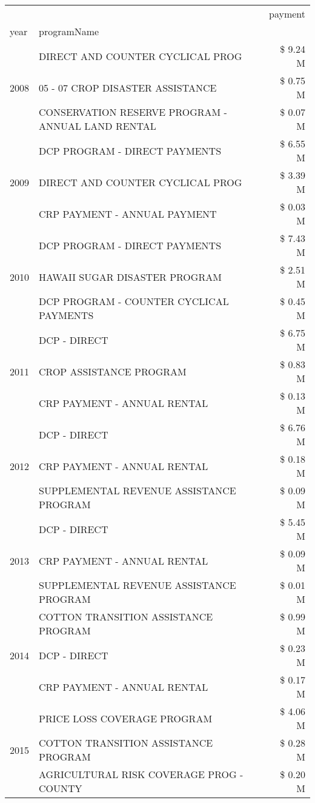 \begin{tabular}{llr}
\toprule
 &  & payment \\
year & programName &  \\
\midrule
\multirow[t]{3}{*}{2008} & DIRECT AND COUNTER CYCLICAL PROG & \$ 9.24 M \\
 & 05 - 07 CROP DISASTER ASSISTANCE & \$ 0.75 M \\
 & CONSERVATION RESERVE PROGRAM - ANNUAL LAND RENTAL & \$ 0.07 M \\
\cline{1-3}
\multirow[t]{3}{*}{2009} & DCP PROGRAM - DIRECT PAYMENTS & \$ 6.55 M \\
 & DIRECT AND COUNTER CYCLICAL PROG & \$ 3.39 M \\
 & CRP PAYMENT - ANNUAL PAYMENT & \$ 0.03 M \\
\cline{1-3}
\multirow[t]{3}{*}{2010} & DCP PROGRAM - DIRECT PAYMENTS & \$ 7.43 M \\
 & HAWAII SUGAR DISASTER PROGRAM & \$ 2.51 M \\
 & DCP PROGRAM - COUNTER CYCLICAL PAYMENTS & \$ 0.45 M \\
\cline{1-3}
\multirow[t]{3}{*}{2011} & DCP - DIRECT & \$ 6.75 M \\
 & CROP ASSISTANCE PROGRAM & \$ 0.83 M \\
 & CRP PAYMENT - ANNUAL RENTAL & \$ 0.13 M \\
\cline{1-3}
\multirow[t]{3}{*}{2012} & DCP - DIRECT & \$ 6.76 M \\
 & CRP PAYMENT - ANNUAL RENTAL & \$ 0.18 M \\
 & SUPPLEMENTAL REVENUE ASSISTANCE PROGRAM & \$ 0.09 M \\
\cline{1-3}
\multirow[t]{3}{*}{2013} & DCP - DIRECT & \$ 5.45 M \\
 & CRP PAYMENT - ANNUAL RENTAL & \$ 0.09 M \\
 & SUPPLEMENTAL REVENUE ASSISTANCE PROGRAM & \$ 0.01 M \\
\cline{1-3}
\multirow[t]{3}{*}{2014} & COTTON TRANSITION ASSISTANCE PROGRAM & \$ 0.99 M \\
 & DCP - DIRECT & \$ 0.23 M \\
 & CRP PAYMENT - ANNUAL RENTAL & \$ 0.17 M \\
\cline{1-3}
\multirow[t]{3}{*}{2015} & PRICE LOSS COVERAGE PROGRAM & \$ 4.06 M \\
 & COTTON TRANSITION ASSISTANCE PROGRAM & \$ 0.28 M \\
 & AGRICULTURAL RISK COVERAGE PROG - COUNTY & \$ 0.20 M \\
\cline{1-3}

\end{tabular}
